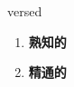 
\begin{frame}
{\huge versed}
\begin{center}
\begin{enumerate}\Large
  \item \textbf{熟知的}
  \item \textbf{精通的}
\end{enumerate}
\end{center}
\end{frame}
